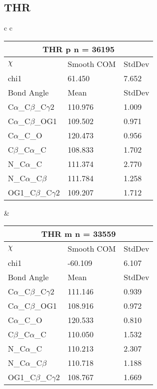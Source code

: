 \newpage
\subsection{THR}

\begin{longtable}{ c c }

  \begin{tabular}{ l l l }
  \toprule
  \multicolumn{3}{c}{THR \textbf{p} n = 36195} \\ \toprule
  $\chi$       & Smooth COM & StdDev \\ \midrule
  chi1 & 61.450 & 7.652 \\ \midrule
  Bond Angle   & Mean     & StdDev \\ \midrule
  C$\alpha$\_C$\beta$\_C$\gamma$2 & 110.976 & 1.009\\
  C$\alpha$\_C$\beta$\_OG1 & 109.502 & 0.971\\
  C$\alpha$\_C\_O & 120.473 & 0.956\\
  C$\beta$\_C$\alpha$\_C & 108.833 & 1.702\\
  N\_C$\alpha$\_C & 111.374 & 2.770\\
  N\_C$\alpha$\_C$\beta$ & 111.784 & 1.258\\
  OG1\_C$\beta$\_C$\gamma$2 & 109.207 & 1.712\\
  \bottomrule
  \end{tabular}
  &
  \begin{tabular}{ l l l }
  \toprule
  \multicolumn{3}{c}{THR \textbf{m} n = 33559} \\ \toprule
  $\chi$       & Smooth COM & StdDev \\ \midrule
  chi1 & -60.109 & 6.107 \\ \midrule
  Bond Angle   & Mean     & StdDev \\ \midrule
  C$\alpha$\_C$\beta$\_C$\gamma$2 & 111.146 & 0.939\\
  C$\alpha$\_C$\beta$\_OG1 & 108.916 & 0.972\\
  C$\alpha$\_C\_O & 120.533 & 0.810\\
  C$\beta$\_C$\alpha$\_C & 110.050 & 1.532\\
  N\_C$\alpha$\_C & 110.213 & 2.307\\
  N\_C$\alpha$\_C$\beta$ & 110.718 & 1.188\\
  OG1\_C$\beta$\_C$\gamma$2 & 108.767 & 1.669\\
  \bottomrule
  \end{tabular}
  \\
  \begin{tabular}{ l l l }

\end{tabular}
\end{longtable}
